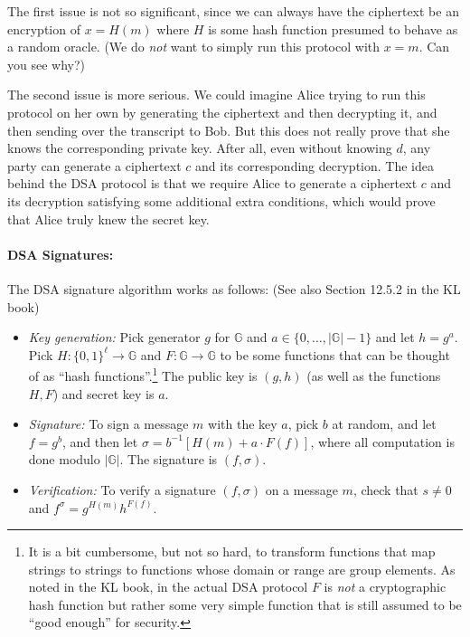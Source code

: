 The first issue is not so significant, since we can always have the
ciphertext be an encryption of \(x=H(m)\) where \(H\) is some hash
function presumed to behave as a random oracle. (We do \emph{not} want
to simply run this protocol with \(x=m\). Can you see why?)

The second issue is more serious. We could imagine Alice trying to run
this protocol on her own by generating the ciphertext and then
decrypting it, and then sending over the transcript to Bob. But this
does not really prove that she knows the corresponding private key.
After all, even without knowing \(d\), any party can generate a
ciphertext \(c\) and its corresponding decryption. The idea behind the
DSA protocol is that we require Alice to generate a ciphertext \(c\) and
its decryption satisfying some additional extra conditions, which would
prove that Alice truly knew the secret key.

\paragraph{DSA Signatures:} The DSA signature algorithm works as
follows: (See also Section 12.5.2 in the KL book)

\begin{itemize}
\tightlist
\item
  \emph{Key generation:} Pick generator \(g\) for \(\mathbb{G}\) and
  \(a\in \{0,\ldots,|\mathbb{G}|-1\}\) and let \(h=g^a\). Pick
  \(H:\{0,1\}^\ell\rightarrow\mathbb{G}\) and
  \(F:\mathbb{G}\rightarrow\mathbb{G}\) to be some functions that can be
  thought of as ``hash functions''.\footnote{It is a bit cumbersome, but
    not so hard, to transform functions that map strings to strings to
    functions whose domain or range are group elements. As noted in the
    KL book, in the actual DSA protocol \(F\) is \emph{not} a
    cryptographic hash function but rather some very simple function
    that is still assumed to be ``good enough'' for security.} The
  public key is \((g,h)\) (as well as the functions \(H,F\)) and secret
  key is \(a\).\\
\item
  \emph{Signature:} To sign a message \(m\) with the key \(a\), pick
  \(b\) at random, and let \(f=g^b\), and then let
  \(\sigma = b^{-1}[H(m)+a\cdot F(f)]\), where all computation is done
  modulo \(|\mathbb{G}|\). The signature is \((f,\sigma)\).\\
\item
  \emph{Verification:} To verify a signature \((f,\sigma)\) on a message
  \(m\), check that \(s\neq 0\) and \(f^\sigma=g^{H(m)}h^{F(f)}\).
\end{itemize}

